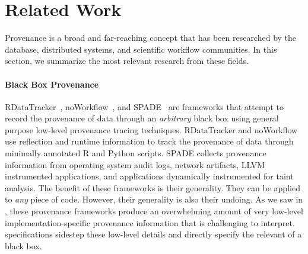 \section{Related Work}


Provenance is a broad and far-reaching concept that has been researched by the
database, distributed systems, and scientific workflow communities. In this
section, we summarize the most relevant research from these fields.

\paragraph{Black Box Provenance}
RDataTracker~\cite{lerner2014collecting},
noWorkflow~\cite{murta2014noworkflow}, and SPADE~\cite{gehani2012spade} are
frameworks that attempt to record the provenance of data through an
\emph{arbitrary} black box using general purpose low-level provenance tracing
techniques. RDataTracker and noWorkflow use reflection and runtime information
to track the provenance of data through minimally annotated R and Python
scripts. SPADE collects provenance information from operating system audit
logs, network artifacts, LLVM instrumented applications, and applications
dynamically instrumented for taint analysis. The benefit of these frameworks is
their generality. They can be applied to \emph{any} piece of code. However,
their generality is also their undoing. As we saw in , these
provenance frameworks produce an overwhelming amount of very low-level
implementation-specific provenance information that is challenging to
interpret. \watprovenance{} specifications sidestep these low-level details and
directly specify the relevant \watprovenance{} of a black box.

